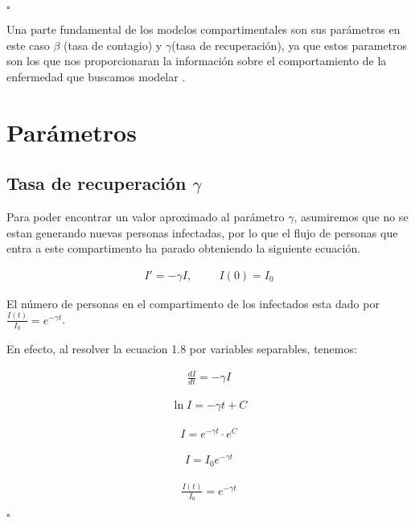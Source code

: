 \hfill	$\square$

Una parte fundamental de los modelos compartimentales son sus parámetros en este caso $\beta$ (tasa de contagio) y $\gamma$(tasa de recuperación), ya que estos parametros son los que nos proporcionaran la información sobre el comportamiento de la enfermedad que buscamos modelar \cite{Martcheva}.

\section{Parámetros}
\subsection{Tasa de recuperación \textbf{$\gamma$}}

Para poder encontrar un valor aproximado al parámetro $\gamma$, asumiremos que no se estan generando nuevas personas infectadas, por lo que el flujo de personas que entra a este compartimento ha parado obteniendo la siguiente ecuación.

\begin{align}
I' = -\gamma I, \hspace{1cm} I(0) = I_{0}
\end{align}

\begin{Af}

El número de personas en el compartimento de los infectados esta dado por $\frac{I(t)}{I_{0}} = e^{-\gamma t}$.

\end{Af}

\begin{Dem}
En efecto, al resolver la ecuacion 1.8 por variables separables, tenemos: 

\begin{align*}
\frac{dI}{dt} = - \gamma I
\end{align*}

\begin{align*}
\ln{I} = - \gamma t + C
\end{align*}

\begin{align*}
I = e^{- \gamma t} \cdot e^{C}
\end{align*}

\begin{align*}
I = I_{0} e^{- \gamma t}
\end{align*}

\begin{align*}
\frac{I(t)}{I_{0}} = e^{-\gamma t}
\end{align*}

\hfill	$\square$

\end{Dem}

